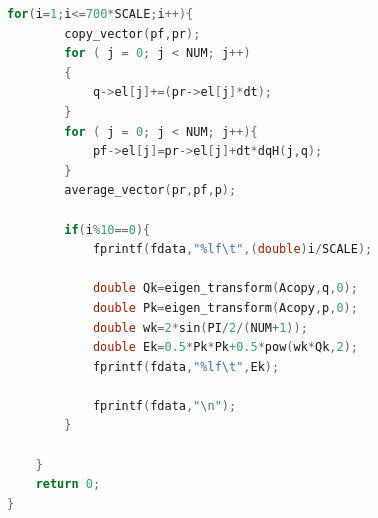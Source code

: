 \documentclass[10pt, a4paper]{article}
\begin{document}
\begin{lstlisting}[language=C]
    for(i=1;i<=700*SCALE;i++){
        copy_vector(pf,pr);
        for ( j = 0; j < NUM; j++)
        {
            q->el[j]+=(pr->el[j]*dt);
        }
        for ( j = 0; j < NUM; j++){
            pf->el[j]=pr->el[j]+dt*dqH(j,q);
        }
        average_vector(pr,pf,p);

        if(i%10==0){
            fprintf(fdata,"%lf\t",(double)i/SCALE);

            double Qk=eigen_transform(Acopy,q,0);
            double Pk=eigen_transform(Acopy,p,0);
            double wk=2*sin(PI/2/(NUM+1));
            double Ek=0.5*Pk*Pk+0.5*pow(wk*Qk,2);
            fprintf(fdata,"%lf\t",Ek);

            fprintf(fdata,"\n");
        }
        
    }
    return 0;
}
    \end{lstlisting}
\end{document}
